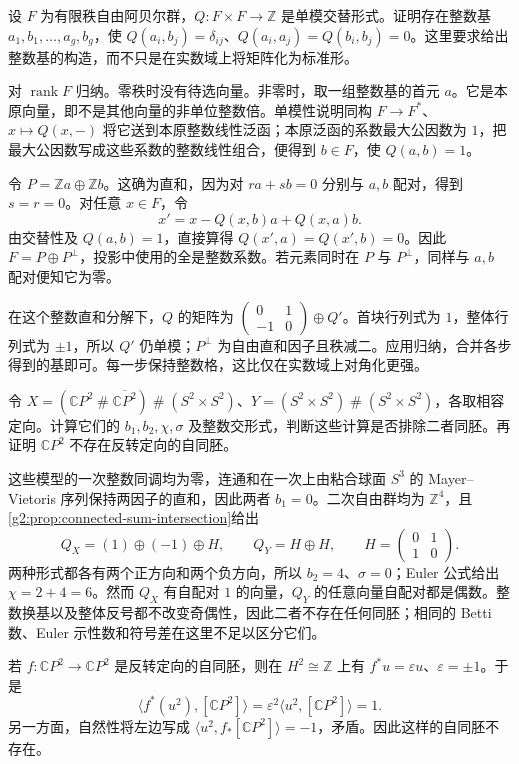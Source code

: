 \begin{exercise}\label{g2:ex:integral-symplectic-basis}
	设 \(F\) 为有限秩自由阿贝尔群，\(Q:F\times F\to\mathbb Z\) 是单模交替形式。证明存在整数基 \(a_1,b_1,\ldots,a_g,b_g\)，使 \(Q(a_i,b_j)=\delta_{ij}\)、\(Q(a_i,a_j)=Q(b_i,b_j)=0\)。这里要求给出整数基的构造，而不只是在实数域上将矩阵化为标准形。
\end{exercise}
\begin{solution}
	对 \(\operatorname{rank}F\) 归纳。零秩时没有待选向量。非零时，取一组整数基的首元 \(a\)。它是本原向量，即不是其他向量的非单位整数倍。单模性说明同构 \(F\to F^*\)、\(x\mapsto Q(x,-)\) 将它送到本原整数线性泛函；本原泛函的系数最大公因数为 \(1\)，把最大公因数写成这些系数的整数线性组合，便得到 \(b\in F\)，使 \(Q(a,b)=1\)。

	令 \(P=\mathbb Za\oplus\mathbb Zb\)。这确为直和，因为对 \(ra+sb=0\) 分别与 \(a,b\) 配对，得到 \(s=r=0\)。对任意 \(x\in F\)，令
	\[
		x'=x-Q(x,b)a+Q(x,a)b.
	\]
	由交替性及 \(Q(a,b)=1\)，直接算得 \(Q(x',a)=Q(x',b)=0\)。因此 \(F=P\oplus P^\perp\)，投影中使用的全是整数系数。若元素同时在 \(P\) 与 \(P^\perp\)，同样与 \(a,b\) 配对便知它为零。

	在这个整数直和分解下，\(Q\) 的矩阵为 \(\left(\begin{smallmatrix}0&1\\-1&0\end{smallmatrix}\right)\oplus Q'\)。首块行列式为 \(1\)，整体行列式为 \(\pm1\)，所以 \(Q'\) 仍单模；\(P^\perp\) 为自由直和因子且秩减二。应用归纳，合并各步得到的基即可。每一步保持整数格，这比仅在实数域上对角化更强。
\end{solution}

\begin{exercise}\label{g2:ex:four-manifold-form-comparison}
	令 \(X=(\mathbb CP^2\mathbin{\#}\overline{\mathbb CP^2})\mathbin{\#}(S^2\times S^2)\)、\(Y=(S^2\times S^2)\mathbin{\#}(S^2\times S^2)\)，各取相容定向。计算它们的 \(b_1,b_2,\chi,\sigma\) 及整数交形式，判断这些计算是否排除二者同胚。再证明 \(\mathbb CP^2\) 不存在反转定向的自同胚。
\end{exercise}
\begin{solution}
	这些模型的一次整数同调均为零，连通和在一次上由粘合球面 \(S^3\) 的 Mayer--Vietoris 序列保持两因子的直和，因此两者 \(b_1=0\)。二次自由群均为 \(\mathbb Z^4\)，且\cref{g2:prop:connected-sum-intersection}给出
	\[
		Q_X=(1)\oplus(-1)\oplus H,
		\qquad Q_Y=H\oplus H,
		\qquad H=\begin{pmatrix}0&1\\1&0\end{pmatrix}.
	\]
	两种形式都各有两个正方向和两个负方向，所以 \(b_2=4\)、\(\sigma=0\)；Euler 公式给出 \(\chi=2+4=6\)。然而 \(Q_X\) 有自配对 \(1\) 的向量，\(Q_Y\) 的任意向量自配对都是偶数。整数换基以及整体反号都不改变奇偶性，因此二者不存在任何同胚；相同的 Betti 数、Euler 示性数和符号差在这里不足以区分它们。

	若 \(f:\mathbb CP^2\to\mathbb CP^2\) 是反转定向的自同胚，则在 \(H^2\cong\mathbb Z\) 上有 \(f^*u=\varepsilon u\)、\(\varepsilon=\pm1\)。于是
	\[
		\langle f^*(u^2),[\mathbb CP^2]\rangle
		=\varepsilon^2\langle u^2,[\mathbb CP^2]\rangle=1.
	\]
	另一方面，自然性将左边写成 \(\langle u^2,f_*[\mathbb CP^2]\rangle=-1\)，矛盾。因此这样的自同胚不存在。
\end{solution}


